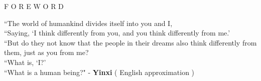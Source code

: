 \documentclass[12pt]{article}
\begin{document}
\begingroup
\begin{center}
\end{center}
\endgroup

\vspace{15\baselineskip}

\begingroup
\begin{center}
\huge F O R E W O R D
\end{center}
\endgroup

\vspace{3\baselineskip}

\begingroup
``The world of humankind divides itself into you and I, \\
``Saying, `I think differently from you, and you think differently from me.' \\
``But do they not know that the people in their dreams also think differently from them, just as you from me? \\
``What is, `I?' \\
``What is a human being?"
\phantom{text} \hfill - \textbf{Yinxi} ( English approximation ) \\
\endgroup
\end{document}
